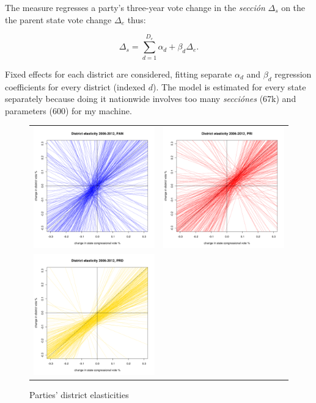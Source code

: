 \documentclass[letter,12pt]{article}
\begin{document}
The measure regresses a party's three-year vote change in the \emph{secci\'on} $\Delta_s$ on the the parent state vote change $\Delta_e$ thus:  

\begin{equation}
\Delta_s = \sum\limits_{d=1}^{D_e} \alpha_d + \beta_d \Delta_e.
\end{equation}

\noindent Fixed effects for each district are considered, fitting separate $\alpha_d$ and $\beta_d$ regression coefficients for every district (indexed $d$). The model is estimated for every state separately because doing it nationwide involves too many \emph{secci\'ones} (67k) and parameters (600) for my machine. 

\begin{figure}
\begin{center}
  \begin{tabular}{cc}
    \includegraphics[width=.4\columnwidth]{elastpand0.pdf} & \includegraphics[width=.4\columnwidth]{elastprid0.pdf} \\
    \includegraphics[width=.4\columnwidth]{elastprdd0.pdf} &  \\
  \end{tabular}
  \caption{Parties' district elasticities}\label{F:malmgnat}
\end{center}
\end{figure}




%

\end{document}
